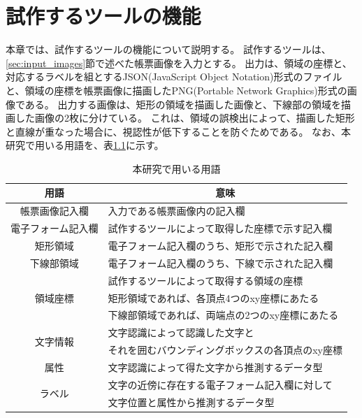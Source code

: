 \chapter{試作するツールの機能}\label{cha:Function}
本章では、試作するツールの機能について説明する。
試作するツールは、\ref{sec:input_images}節で述べた帳票画像を入力とする。
出力は、領域の座標と、対応するラベルを組とするJSON(JavaScript Object Notation)形式のファイルと、領域の座標を帳票画像に描画したPNG(Portable Network Graphics)形式の画像である。
出力する画像は、矩形の領域を描画した画像と、下線部の領域を描画した画像の2枚に分けている。
これは、領域の誤検出によって、描画した矩形と直線が重なった場合に、視認性が低下することを防ぐためである。
なお、本研究で用いる用語を、表\ref{tb:term}に示す。

\begin{table}[t]
	\caption{本研究で用いる用語}
	\label{tb:term}
	\centering
	\begin{tabular}{|c||l|}
        \hline
		用語 & \multicolumn{1}{c|}{意味} \\
        \hline \hline
		帳票画像記入欄 & 入力である帳票画像内の記入欄 \\
        \hline
		電子フォーム記入欄 & 試作するツールによって取得した座標で示す記入欄 \\
        \hline
		矩形領域 & 電子フォーム記入欄のうち、矩形で示された記入欄 \\
        \hline
		下線部領域 & 電子フォーム記入欄のうち、下線で示された記入欄 \\
        \hline
        \multirow{3}{*}{領域座標} & 試作するツールによって取得する領域の座標 \\
                                    & 矩形領域であれば、各頂点4つのxy座標にあたる \\
                                    & 下線部領域であれば、両端点の2つのxy座標にあたる \\
        \hline
        \multirow{2}{*}{文字情報} & 文字認識によって認識した文字と \\
                                    & それを囲むバウンディングボックスの各頂点のxy座標 \\
        \hline
        属性 & 文字認識によって得た文字から推測するデータ型 \\
        \hline
        \multirow{2}{*}{ラベル} & 文字の近傍に存在する電子フォーム記入欄に対して\\
                                    & 文字位置と属性から推測するデータ型 \\
        \hline
	\end{tabular}
\end{table}


